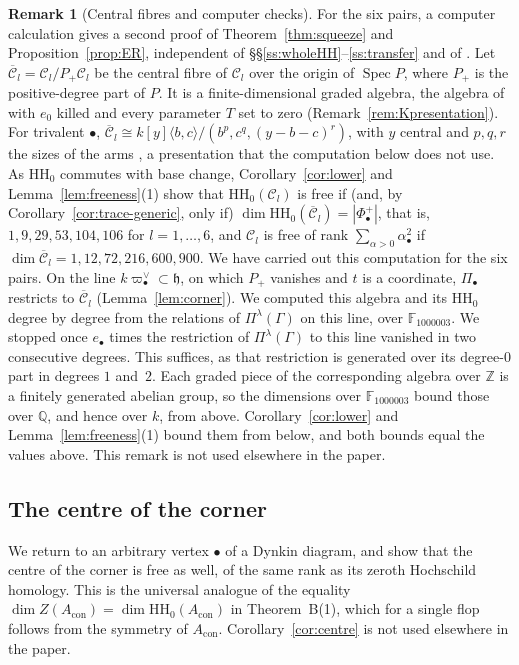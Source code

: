 \documentclass[11pt]{amsart}
\numberwithin{table}{section}
\numberwithin{figure}{section}
\numberwithin{equation}{section}
\theoremstyle{definition}
\newtheorem{rem}[thm]{Remark}
\theoremstyle{plain}
\newcommand{\Acon}{A_{\mathrm{con}}}
\newcommand{\cC}{\mathcal{C}}
\newcommand{\h}{\mathfrak{h}}
\newcommand{\bul}{\bullet}
\newcommand{\HH}{\mathrm{HH}}
\newcommand{\Z}{\mathbb{Z}}
\newcommand{\Q}{\mathbb{Q}}
\DeclareMathOperator{\Spec}{Spec}
\begin{document}
\begin{rem}[Central fibres and computer checks]\label{rem:noER}
For the six pairs, a computer calculation gives a second proof of Theorem~\ref{thm:squeeze} and Proposition~\ref{prop:ER}, independent of \S\S\ref{ss:wholeHH}--\ref{ss:transfer} and of \cite{ER}. Let $\overline{\cC}_l = \cC_l/P_+\cC_l$ be the central fibre of $\cC_l$ over the origin of $\Spec P$, where $P_+$ is the positive-degree part of $P$. It is a finite-dimensional graded algebra, the algebra of \cite[Thm~1.3, Examples~4.23--4.27]{K} with $e_0$ killed and every parameter $T$ set to zero (Remark~\ref{rem:Kpresentation}). For trivalent $\bul$, $\overline{\cC}_l \cong k[y]\langle b, c\rangle/(b^p, c^q, (y - b - c)^r)$, with $y$ central and $p, q, r$ the sizes of the arms \cite[Cor~3.4]{ER}, a presentation that the computation below does not use. As $\HH_0$ commutes with base change, Corollary~\ref{cor:lower} and Lemma~\ref{lem:freeness}(1) show that $\HH_0(\cC_l)$ is free if (and, by Corollary~\ref{cor:trace-generic}, only if) $\dim \HH_0(\overline{\cC}_l) = |\Phi^+_\bul|$, that is, $1, 9, 29, 53, 104, 106$ for $l = 1, \dots, 6$, and $\cC_l$ is free of rank $\sum_{\alpha>0}\alpha_\bul^2$ if $\dim \overline{\cC}_l = 1, 12, 72, 216, 600, 900$. We have carried out this computation for the six pairs. On the line $k\varpi_\bul^\vee \subset \h$, on which $P_+$ vanishes and $t$ is a coordinate, $\Pi_\bul$ restricts to $\overline{\cC}_l$ (Lemma~\ref{lem:corner}). We computed this algebra and its $\HH_0$ degree by degree from the relations of $\Pi^\lambda(\Gamma)$ on this line, over $\mathbb F_{1000003}$. We stopped once $e_\bul$ times the restriction of $\Pi^\lambda(\Gamma)$ to this line vanished in two consecutive degrees. This suffices, as that restriction is generated over its degree-$0$ part in degrees $1$ and~$2$. Each graded piece of the corresponding algebra over $\Z$ is a finitely generated abelian group, so the dimensions over $\mathbb F_{1000003}$ bound those over $\Q$, and hence over $k$, from above. Corollary~\ref{cor:lower} and Lemma~\ref{lem:freeness}(1) bound them from below, and both bounds equal the values above. This remark is not used elsewhere in the paper.
\end{rem}

\subsection{The centre of the corner}\label{ss:centre}

We return to an arbitrary vertex $\bul$ of a Dynkin diagram, and show that the centre of the corner is free as well, of the same rank as its zeroth Hochschild homology. This is the universal analogue of the equality $\dim Z(\Acon) = \dim \HH_0(\Acon)$ in Theorem~B(1), which for a single flop follows from the symmetry of $\Acon$. Corollary~\ref{cor:centre} is not used elsewhere in the paper.
\end{document}
